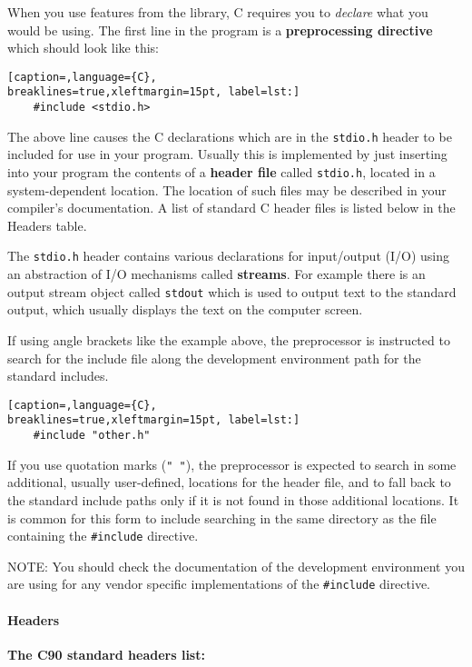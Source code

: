 When you use features from the library, C requires you to \emph{declare} what
you would be using. The first line in the program is a \textbf{preprocessing
directive} which should look like this:
\lstset{basicstyle=\scriptsize, numbers=left, captionpos=b, tabsize=4}
\begin{lstlisting}[caption=,language={C},
breaklines=true,xleftmargin=15pt, label=lst:]
	#include <stdio.h>
\end{lstlisting}

The above line causes the C declarations which are in the \texttt{stdio.h}
header to be included for use in your program. Usually this is implemented by
just inserting into your program the contents of a \textbf{header file} called
\texttt{stdio.h}, located in a system-dependent location. The location of such
files may be described in your compiler's documentation. A list of standard C
header files is listed below in the Headers table.

The \texttt{stdio.h} header contains various declarations for input/output
(I/O) using an abstraction of I/O mechanisms called \textbf{streams}. For
example there is an output stream object called \texttt{stdout} which is used
to output text to the standard output, which usually displays the text on the
computer screen.

If using angle brackets like the example above, the preprocessor is instructed
to search for the include file along the development environment path for the
standard includes.
\lstset{basicstyle=\scriptsize, numbers=left, captionpos=b, tabsize=4}
\begin{lstlisting}[caption=,language={C},
breaklines=true,xleftmargin=15pt, label=lst:]
	#include "other.h"
\end{lstlisting}

If you use quotation marks (\texttt{" "}), the preprocessor is expected to
search in some additional, usually user-defined, locations for the header file,
and to fall back to the standard include paths only if it is not found in those
additional locations. It is common for this form to include searching in the
same directory as the file containing the \texttt{\#include} directive.

NOTE: You should check the documentation of the development environment you
are using for any vendor specific implementations of the \texttt{\#include}
directive. \\

\paragraph{Headers}
\textbf{The C90 standard headers list:}

